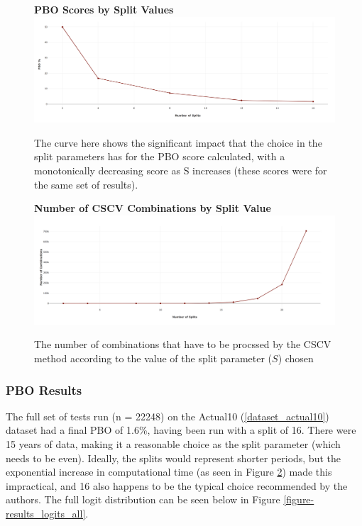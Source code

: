\documentclass[a4paper,11pt,oneside]{article}
\theoremstyle{plain}
\theoremstyle{definition}
\begin{document}
	\begin{figure}[H]
		\centering 
		\textbf{PBO Scores by Split Values}
		\includegraphics[scale=0.25]{images/results/pbo/PBO_by_Split.png} 
		\caption[PBO Scores by Split Values]{
			\newline The curve here shows the significant impact that the choice in the split parameters has for the PBO score calculated, with a monotonically decreasing score as S increases (these scores were for the same set of results). }
		\label{figure-PBO_by_Split}
	\end{figure}
	
	\begin{figure}[H]
		\centering 
		\textbf{Number of CSCV Combinations by Split Value}
		\includegraphics[scale=0.25]{images/results/pbo/combination_sizes.png} 
		\caption[Number of CSCV Combinations by Split Value]{
			\newline The number of combinations that have to be procssed by the CSCV method according to the value of the split parameter ($S$) chosen}
		\label{figure-s_combinations}
	\end{figure}
	
	
	\subsubsection{PBO Results}
	
	
	The full set of tests run (n = 22248) on the Actual10 (\ref{dataset_actual10}) dataset had a final PBO of 1.6\%, having been run with a split of 16. There were 15 years of data, making it a reasonable choice as the split parameter (which needs to be even). Ideally, the splits would represent shorter periods, but the exponential increase in computational time (as seen in Figure \ref{figure-s_combinations}) made this impractical, and 16 also happens to be the typical choice recommended by the authors. The full logit distribution can be seen below in Figure \ref{figure-results_logits_all}.
	
\end{document}

